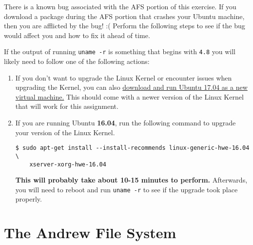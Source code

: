 \documentclass{article}
\begin{document}

\medskip

\begin{mdframed}
\textbf{\color{red}{!!! IMPORTANT NOTE !!!}}

There is a known bug associated with the AFS portion of this exercise. If you
download a package during the AFS portion that crashes your Ubuntu machine, then
you are afflicted by the bug! :( Perform the following steps to see if the
bug would affect you and how to fix it ahead of time.

If the output of running \texttt{uname -r} is something that begins with
\texttt{4.8} you will likely need to follow one of the following actions:

\begin{enumerate}

    \item
        If you don't want to upgrade the Linux Kernel or encounter issues when
        upgrading the Kernel, you can also
        \href{https://www.ubuntu.com/download/desktop}{download and run Ubuntu
        17.04 as a new virtual machine.} This should come with a newer version
        of the Linux Kernel that will work for this assignment.

    \item
        If you are running Ubuntu \textbf{16.04}, run the following command to
        upgrade your version of the Linux Kernel.

\begin{lstlisting}
$ sudo apt-get install --install-recommends linux-generic-hwe-16.04 \
    xserver-xorg-hwe-16.04
\end{lstlisting}

        \textbf{This will probably take about 10-15 minutes to perform.}
        Afterwards, you will need to reboot and run \texttt{uname -r} to see if
        the upgrade took place properly.
\end{enumerate}


\end{mdframed}


\section*{The Andrew File System}
\end{document}

